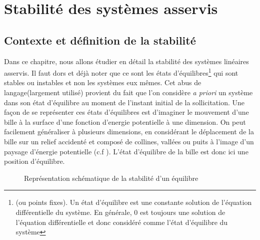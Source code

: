 \chapter{Stabilité des systèmes asservis\label{chap-stab}}
\minitoc
\newpage
\section{Contexte et définition de la stabilité} 
Dans ce chapitre, nous allons étudier en détail la stabilité des systèmes
linéaires asservis. Il faut dors et déjà noter que ce sont les états 
d'équilibres\footnote{(ou points fixes). Un état d'équilibre est une constante
solution de l'équation différentielle du système. En générale, 0 est toujours
une solution de l'équation différentielle et donc considéré comme l'état 
d'équilibre du système} qui sont stables ou instables et non les systèmes eux 
mêmes. Cet \og abus de langage\fg (largement utilisé) provient du fait que 
l'on considère \emph{a priori} un système dans son état d'équilibre 
au moment de l'instant initial de la sollicitation. 
Une façon de se représenter ces états d'équilibres est d'imaginer le 
mouvement d'une bille à la surface d'une fonction d'energie potentielle à une 
dimension. 
On peut facilement généraliser à plusieurs dimensions, en considérant le 
déplacement de la bille sur un relief accidenté et composé de collines, 
vallées ou puits à l'image d'un paysage d'énergie potentielle 
(c.f ). L'état d'équilibre de la bille est donc ici 
une position d'équilibre.
\begin{figure}[!h]
    \centering
    
    \caption{Représentation schématique de la stabilité d'un équilibre
             \label{fig-stab}}
\end{figure}

